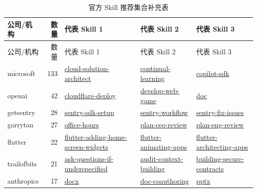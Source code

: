 \documentclass[UTF8,a4paper,12pt]{ctexart}
\begin{document}
\begin{longtable}{p{2.8cm} r p{4.2cm} p{4.2cm} p{4.2cm}}
\caption{官方 Skill 推荐集合补充表}\label{tab:appendix-official}\\
\toprule
公司/机构 & 数量 & 代表 Skill 1 & 代表 Skill 2 & 代表 Skill 3 \\
\midrule
\endfirsthead
\toprule
公司/机构 & 数量 & 代表 Skill 1 & 代表 Skill 2 & 代表 Skill 3 \\
\midrule
\endhead
microsoft & 133 & \href{https://officialskills.sh/microsoft/skills/cloud-solution-architect}{cloud-solution-architect} & \href{https://officialskills.sh/microsoft/skills/continual-learning}{continual-learning} & \href{https://officialskills.sh/microsoft/skills/copilot-sdk}{copilot-sdk} \\
openai & 42 & \href{https://officialskills.sh/openai/skills/cloudflare-deploy}{cloudflare-deploy} & \href{https://officialskills.sh/openai/skills/develop-web-game}{develop-web-game} & \href{https://officialskills.sh/openai/skills/doc}{doc} \\
getsentry & 28 & \href{https://officialskills.sh/getsentry/skills/sentry-sdk-setup}{sentry-sdk-setup} & \href{https://officialskills.sh/getsentry/skills/sentry-workflow}{sentry-workflow} & \href{https://officialskills.sh/getsentry/skills/sentry-fix-issues}{sentry-fix-issues} \\
garrytan & 27 & \href{https://officialskills.sh/garrytan/skills/office-hours}{office-hours} & \href{https://officialskills.sh/garrytan/skills/plan-ceo-review}{plan-ceo-review} & \href{https://officialskills.sh/garrytan/skills/plan-eng-review}{plan-eng-review} \\
flutter & 22 & \href{https://officialskills.sh/flutter/skills/flutter-adding-home-screen-widgets}{flutter-adding-home-screen-widgets} & \href{https://officialskills.sh/flutter/skills/flutter-animating-apps}{flutter-animating-apps} & \href{https://officialskills.sh/flutter/skills/flutter-architecting-apps}{flutter-architecting-apps} \\
trailofbits & 21 & \href{https://officialskills.sh/trailofbits/skills/ask-questions-if-underspecified}{ask-questions-if-underspecified} & \href{https://officialskills.sh/trailofbits/skills/audit-context-building}{audit-context-building} & \href{https://officialskills.sh/trailofbits/skills/building-secure-contracts}{building-secure-contracts} \\
anthropics & 17 & \href{https://officialskills.sh/anthropics/skills/docx}{docx} & \href{https://officialskills.sh/anthropics/skills/doc-coauthoring}{doc-coauthoring} & \href{https://officialskills.sh/anthropics/skills/pptx}{pptx} \\

\end{longtable}
\end{document}
